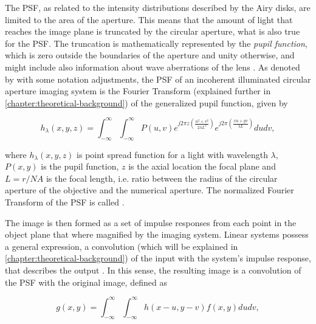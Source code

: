 The PSF, as related to the intensity distributions described by the Airy disks, are limited to the area of the aperture. This means that the amount of light that reaches the image plane is truncated by the circular aperture, what is also true for the PSF. The truncation is mathematically represented by the \emph{pupil function}, which is zero outside the boundaries of the aperture and unity otherwise, and might include also information about wave aberrations of the lens \cite{goodman1996introduction}. As denoted by  with some notation adjustments, the PSF of an incoherent illuminated circular aperture imaging system is the Fourier Transform (explained further in \autoref{chapter:theoretical-background}) of the generalized pupil function, given by

\begin{equation}
\label{eqn:incoherent_psf}
h_{\lambda}(x,y,z) = \int_{-\infty}^{\infty}
                     \int_{-\infty}^{\infty}
         P(u,v)
         e^{j 2 \pi z
            \left(
                \frac{u^{2} + v^{2}}{2 \lambda L^{2}}        
            \right)
        }
        e^{j 2 \pi
            \left(
                \frac{xu + yv}{\lambda L}        
            \right)
        }
        du dv,
\end{equation}

\noindent where $h_{\lambda}(x,y,z)$ is point spread function for a light with wavelength $\lambda$, $P(x,y)$ is the pupil function, $z$ is the axial location the focal plane and $L = r / NA$ is the focal length, i.e. ratio between the radius of the circular aperture of the objective and the numerical aperture. The normalized Fourier Transform of the PSF is called  \cite{castleman1996digital}.

The image is then formed as a set of impulse responses from each point in the object plane that where magnified by the imaging system. Linear systems possess a general expression, a convolution (which will be explained in \autoref{chapter:theoretical-background}) of the input with the system's impulse response, that describes the output \cite{brigham1988fast}. In this sense, the resulting image is a convolution of the PSF with the original image, defined as

\begin{equation}
\label{eqn:image_formation_convolution}
g(x,y) = \int_{-\infty}^{\infty}
         \int_{-\infty}^{\infty}
         h(x-u, y-v)f(x,y)du dv,
\end{equation}

